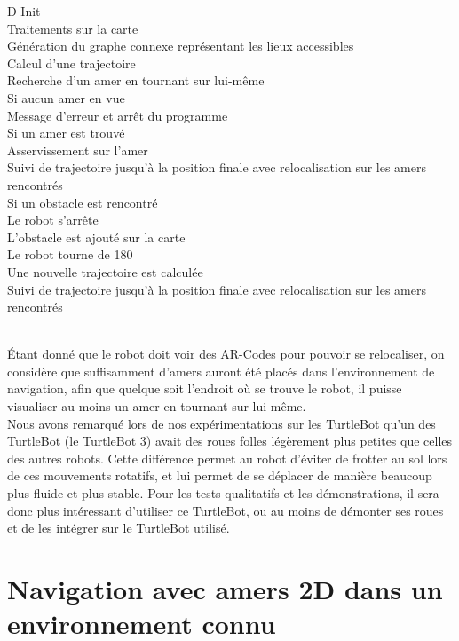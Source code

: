 \documentclass[10pt,a4paper]{article}
\begin{document}
\begin{tabbing}
\>D\>
Init\\\>\>\>
	Traitements sur la carte\\\>\>\>
	Génération du graphe connexe représentant les lieux accessibles\\\>\>\>
	Calcul d'une trajectoire\\\>\>
Recherche d'un amer en tournant sur lui-même\\\>\>
Si aucun amer en vue\\\>\>\>
	Message d'erreur et arrêt du programme\\\>\>
Si un amer est trouvé\\\>\>\>
	Asservissement sur l'amer\\\>\>\>
	Suivi de trajectoire jusqu'à la position finale avec relocalisation sur les amers rencontrés\\\>\>
Si un obstacle est rencontré\\\>\>\>
	Le robot s'arrête\\\>\>\>
	L'obstacle est ajouté sur la carte\\\>\>\>
	Le robot tourne de 180\degree\\\>\>\>
	Une nouvelle trajectoire est calculée\\\>\>
Suivi de trajectoire jusqu'à la position finale avec relocalisation sur les amers rencontrés\\\\
	
\end{tabbing}


Étant donné que le robot doit voir des AR-Codes pour pouvoir se relocaliser, on considère que suffisamment d'amers auront été placés dans l'environnement de navigation, afin que quelque soit l'endroit où se trouve le robot, il puisse visualiser au moins un amer en tournant sur lui-même.\\

Nous avons remarqué lors de nos expérimentations sur les TurtleBot qu'un des TurtleBot (le TurtleBot 3) avait des roues folles légèrement plus petites que celles des autres robots. Cette différence permet au robot d'éviter de frotter au sol lors de ces mouvements rotatifs, et lui permet de se déplacer de manière beaucoup plus fluide et plus stable. Pour les tests qualitatifs et les démonstrations, il sera donc plus intéressant d'utiliser ce TurtleBot, ou au moins de démonter ses roues et de les intégrer sur le TurtleBot utilisé.


\section{Navigation avec amers 2D dans un environnement connu}
\label{sec:navigation_avec_amers_2D_dans_un_environnement_connu}
\end{document}
